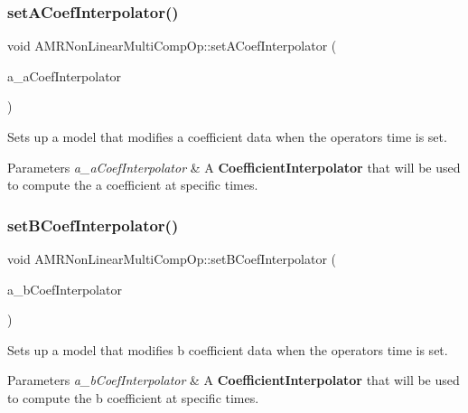 \subsubsection{\texorpdfstring{set\+A\+Coef\+Interpolator()}{setACoefInterpolator()}}
{\footnotesize\ttfamily void A\+M\+R\+Non\+Linear\+Multi\+Comp\+Op\+::set\+A\+Coef\+Interpolator (\begin{DoxyParamCaption}\item[{\textbf{ Ref\+Counted\+Ptr}$<$ \hyperlink{class_coefficient_interpolator_linear}{Coefficient\+Interpolator\+Linear} $>$ \&}]{a\+\_\+a\+Coef\+Interpolator }\end{DoxyParamCaption})\hspace{0.3cm}{\ttfamily [inline]}}

Sets up a model that modifies a coefficient data when the operator\textquotesingle{}s time is set. 
\begin{DoxyParams}{Parameters}
{\em a\+\_\+a\+Coef\+Interpolator} & A \textbf{ Coefficient\+Interpolator} that will be used to compute the a coefficient at specific times. \\
\hline
\end{DoxyParams}
\mbox{\label{class_a_m_r_non_linear_multi_comp_op_a64125ca23b133e2ca86437d7b8cfad3c}} 
\subsubsection{\texorpdfstring{set\+B\+Coef\+Interpolator()}{setBCoefInterpolator()}}
{\footnotesize\ttfamily void A\+M\+R\+Non\+Linear\+Multi\+Comp\+Op\+::set\+B\+Coef\+Interpolator (\begin{DoxyParamCaption}\item[{\textbf{ Ref\+Counted\+Ptr}$<$ \hyperlink{class_coefficient_interpolator_linear_face}{Coefficient\+Interpolator\+Linear\+Face} $>$ \&}]{a\+\_\+b\+Coef\+Interpolator }\end{DoxyParamCaption})\hspace{0.3cm}{\ttfamily [inline]}}

Sets up a model that modifies b coefficient data when the operator\textquotesingle{}s time is set. 
\begin{DoxyParams}{Parameters}
{\em a\+\_\+b\+Coef\+Interpolator} & A \textbf{ Coefficient\+Interpolator} that will be used to compute the b coefficient at specific times. \\
\hline
\end{DoxyParams}
\mbox{\label{class_a_m_r_non_linear_multi_comp_op_afb810f3b1d7826edd752a2d90264cc8e}} 
